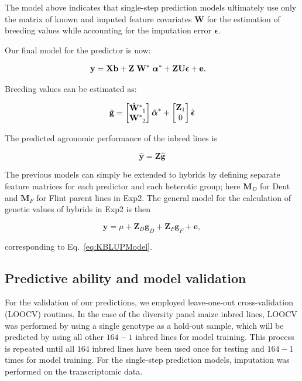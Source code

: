 \documentclass[12pt,titlepage]{article}
\begin{document}
The model above indicates that single-step prediction models ultimately use
only the matrix of known and imputed feature covariates $\mathbf{W}$ for the
estimation of breeding values while accounting for the imputation error
$\boldsymbol{\epsilon}$.

Our final model for the predictor is now:

\begin{align} \label{eq:final-model}
\mathbf{y} &= \mathbf{Xb} +
\mathbf{Z} \;
\tensor[]{\mathbf{W}}{^{*}} \;
\tensor[]{\boldsymbol{\alpha}}{^{*}} +
\mathbf{Z}\mathbf{U} \boldsymbol{\epsilon} +
\mathbf{e}.
\end{align}

Breeding values can be estimated as:

\begin{equation} \label{eq:breeding-values}
\hat{\mathbf{g}} =
 \begin{bmatrix}
  \tensor[]{\hat{\mathbf{W}}}{^{*}_{1}} \\
  \tensor[]{\mathbf{W}}{^{*}_{2}}
 \end{bmatrix}
 \tensor[]{\hat{\boldsymbol{\alpha}}}{^{*}}
 +
 \begin{bmatrix}
  \mathbf{Z}_1 \\
  0
 \end{bmatrix}
 \hat{\boldsymbol{\epsilon}}
\end{equation}


The predicted agronomic performance of the inbred lines is

\begin{equation} \label{eq:inbred-predicted-performance}
\hat{\mathbf{y}} = \mathbf{Z}\mathbf{\hat{g}} 
\end{equation}

The previous models can simply be extended to hybrids by defining separate
feature matrices for each predictor and each heterotic group; here
$\mathbf{M}_{D}$ for Dent and $\mathbf{M}_{F}$ for Flint parent lines in Exp2.
The general model for the calculation of genetic values of hybrids in Exp2 is
then

\begin{equation} \label{eq:hybrid-genetic-value-model}
  \mathbf{y} = \mu + \mathbf{Z}_{D} \mathbf{g}_{D} +
  \mathbf{Z}_{F} \mathbf{g}_{F} +
  \mathbf{e},
\end{equation}

corresponding to Eq.~\ref{eq:KBLUPModel}.


\subsection{Predictive ability and model validation}
For the validation of our predictions, we employed leave-one-out
cross-validation (LOOCV) routines.
In the case of the diversity panel maize inbred lines, LOOCV was performed by 
using a single genotype as a hold-out sample, which will be predicted by using
all other $164 - 1$ inbred lines for model training.
This process is repeated until all $164$ inbred lines have been used once for
testing and $164 - 1$ times for model training.
For the single-step prediction models, imputation was performed on the
transcriptomic data.
\end{document}
